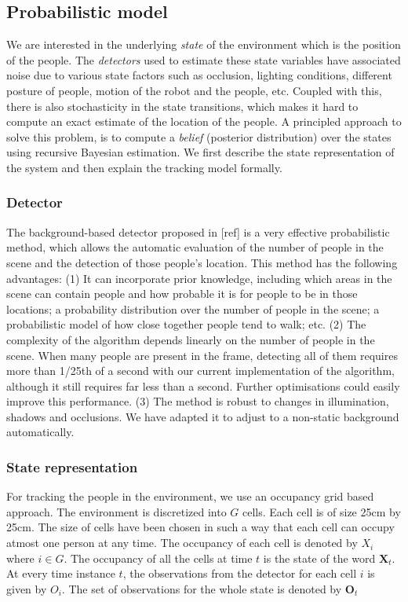 \subsection{Probabilistic model}

We are interested in the underlying \textit{state} of the environment which is the position of the people. The \textit{detectors} used to estimate these state variables have associated noise due to various state factors such as occlusion, lighting conditions, different posture of people, motion of the robot and the people, etc. Coupled with this, there is also stochasticity in the state transitions, which makes it hard to compute an exact estimate of the location of the people. A principled approach to solve this problem, is to compute a \textit{belief} (posterior distribution) over the states using recursive Bayesian estimation. We first describe the state representation of the system and then explain the tracking model formally.

\subsubsection{Detector}
The background-based detector proposed in [ref] is a very effective probabilistic method, which allows the automatic evaluation of the number of people in the scene and the detection of those people’s location. This method has the following advantages: (1) It can incorporate prior knowledge, including which areas in the scene can contain people and how probable it is for people to be in those locations; a probability distribution over the number of people in the scene; a probabilistic model of how close
together people tend to walk; etc. (2) The complexity of the algorithm depends linearly on the number of people in the scene. When many people are present in the frame, detecting all of them requires
more than 1/25th of a second with our current implementation of the algorithm, although it still requires far less than a second. Further optimisations could easily improve this performance. (3) The method is robust to changes in illumination, shadows and occlusions. We have adapted it to adjust to a non-static background automatically.

\subsubsection{State representation}

For tracking the people in the environment, we use an occupancy grid based approach. The environment is discretized into $G$ cells. Each cell is of size 25cm by 25cm. The size of cells have been chosen in such a way that each cell can occupy atmost one person at any time. The occupancy of each cell is denoted by $X_{i}$ where $i \in G$. The occupancy of all the cells at time $t$ is the state of the word $\textbf{X}_{t}$. At every time instance $t$, the observations from the detector for each cell $i$ is given by $O_{i}$. The set of observations for the whole state is denoted by $\textbf{O}_{t}$ 

